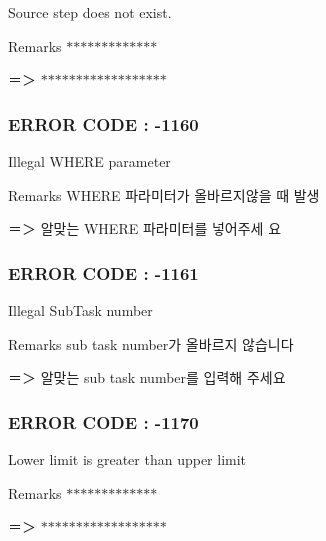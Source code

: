 Source step does not exist. \begin{DoxyRemark}{Remarks}
$\ast$$\ast$$\ast$$\ast$$\ast$$\ast$$\ast$$\ast$$\ast$$\ast$$\ast$$\ast$$\ast$ \par
 ＝＞ $\ast$$\ast$$\ast$$\ast$$\ast$$\ast$$\ast$$\ast$$\ast$$\ast$$\ast$$\ast$$\ast$$\ast$$\ast$$\ast$$\ast$$\ast$ \par

\end{DoxyRemark}


 \subsubsection*{E\-R\-R\-O\-R C\-O\-D\-E \-: -\/1160 }

Illegal W\-H\-E\-R\-E parameter \begin{DoxyRemark}{Remarks}
W\-H\-E\-R\-E 파라미터가 올바르지않을 때 발생 \par
 ＝＞ 알맞는 W\-H\-E\-R\-E 파라미터를 넣어주세 요\par

\end{DoxyRemark}


 \subsubsection*{E\-R\-R\-O\-R C\-O\-D\-E \-: -\/1161 }

Illegal Sub\-Task number \begin{DoxyRemark}{Remarks}
sub task number가 올바르지 않습니다 \par
 ＝＞ 알맞는 sub task number를 입력해 주세요 \par

\end{DoxyRemark}


 \subsubsection*{E\-R\-R\-O\-R C\-O\-D\-E \-: -\/1170 }

Lower limit is greater than upper limit \begin{DoxyRemark}{Remarks}
$\ast$$\ast$$\ast$$\ast$$\ast$$\ast$$\ast$$\ast$$\ast$$\ast$$\ast$$\ast$$\ast$ \par
 ＝＞ $\ast$$\ast$$\ast$$\ast$$\ast$$\ast$$\ast$$\ast$$\ast$$\ast$$\ast$$\ast$$\ast$$\ast$$\ast$$\ast$$\ast$$\ast$ \par

\end{DoxyRemark}


